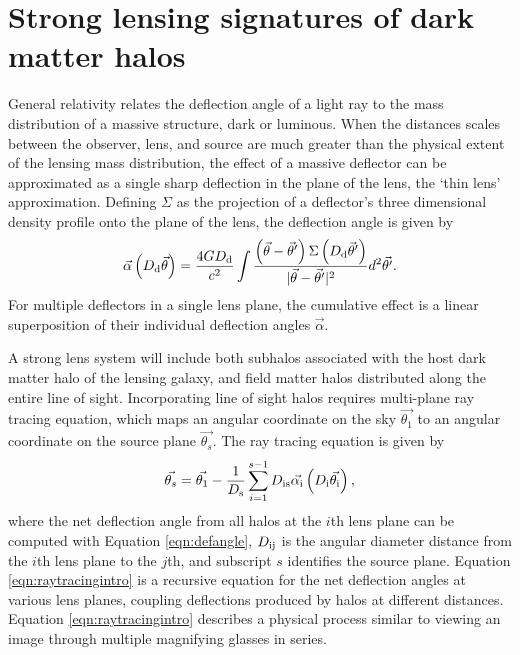 \section{Strong lensing signatures of dark matter halos}
\indent General relativity relates the deflection angle of a light ray to the mass distribution of a massive structure, dark or luminous. When the distances scales between the observer, lens, and source are much greater than the physical extent of the lensing mass distribution, the effect of a massive deflector can be approximated as a single sharp deflection in the plane of the lens, the `thin lens' approximation. Defining $\Sigma$ as the projection of a deflector's three dimensional density profile onto the plane of the lens, the deflection angle is given by \cite{BlandfordNarayan86,Schnedier1997}
\begin{equation}
\label{eqn:defangle}
\vec{\alpha}\left(D_{\rm{d}} \vec{\theta}\right) = \frac{4G D_{\rm{d}}}{c^2} \int \frac{\left(\vec{\theta} - \vec{\theta}^{\prime}\right) \Sigma\left(D_{\rm{d}}\vec{\theta}^{\prime}\right)}{|\vec{\theta} - \vec{\theta}^{\prime}|^2} d^2 \vec{\theta^{\prime}}. 
\end{equation}
For multiple deflectors in a single lens plane, the cumulative effect is a linear superposition of their individual deflection angles $\vec{\alpha}$. 

A strong lens system will include both subhalos associated with the host dark matter halo of the lensing galaxy, and field matter halos distributed along the entire line of sight. Incorporating line of sight halos requires multi-plane ray tracing equation, which maps an angular coordinate on the sky $\vec{\theta_1}$ to an angular coordinate on the source plane $\vec{\theta_s}$. The ray tracing equation is given by \cite{BlandfordNarayan86}
\begin{equation}
\label{eqn:raytracingintro}
\vec{\theta_s} = \vec{\theta_1} - \frac{1}{D_{\rm{s}}} \sum_{i=1}^{s-1} D_{\rm{is}}{\vec{\alpha_{\rm{i}}}} \left(D_{\rm{i}} \vec{\theta_{\rm{i}}}\right),
\end{equation} 
where the net deflection angle from all halos at the $i$th lens plane can be computed with Equation \ref{eqn:defangle}, $D_{\rm{ij}}$ is the angular diameter distance from the $i$th lens plane to the $j$th, and subscript $s$ identifies the source plane. Equation \ref{eqn:raytracingintro} is a recursive equation for the net deflection angles at various lens planes, coupling deflections produced by halos at different distances. Equation \ref{eqn:raytracingintro} describes a physical process similar to viewing an image through multiple magnifying glasses in series. 

